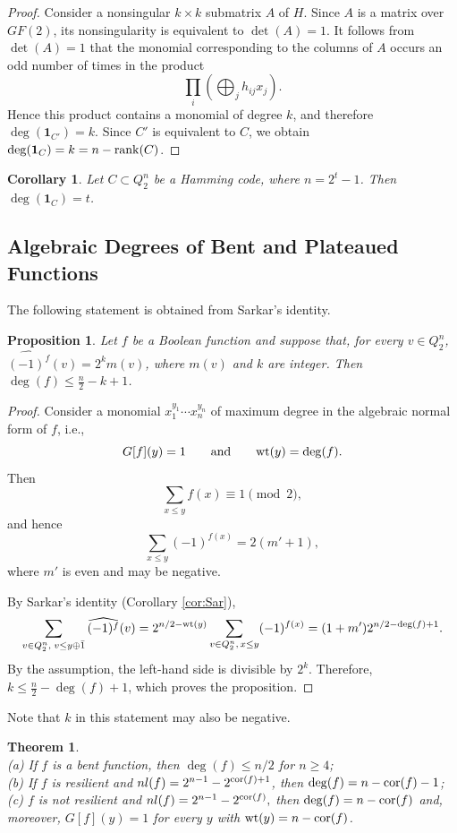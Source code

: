 \documentclass[11pt]{article}
\newtheorem{theorem}{Theorem}[section]
\newtheorem{claim}{Proposition}[section]
\newtheorem{corollary}{Corollary}[section]
\theoremstyle{definition}
\newcommand{\rank}{{\rm rank}}
\newcommand{\wt}{{\rm wt}}
\newcommand{\cor}{{\rm cor}}
\begin{document}
{{{\begin{proof}
Consider a nonsingular $k\times k$ submatrix $A$ of $H$.
Since $A$ is a matrix over $GF(2)$, its nonsingularity is equivalent to
$\det(A)=1$. It follows from $\det(A)=1$ that the monomial corresponding
to the columns of $A$ occurs an odd number of times in the product
\[
\prod_i\left(\bigoplus_j h_{ij}x_j\right).
\]
Hence this product contains a monomial of degree $k$, and therefore
$\deg({\mathbf 1}_{C'})=k$.
Since $C'$ is equivalent to $C$, we obtain
$\deg({\mathbf 1}_C)=k=n-\rank(C)$.
\end{proof}

\begin{corollary}
Let $C\subset Q_2^n$ be a Hamming code, where $n=2^t-1$. Then
$\deg({\mathbf 1}_C)=t$.
\end{corollary}




\subsection{Algebraic Degrees of Bent and Plateaued Functions}

The following statement is  obtained from Sarkar's identity.

\begin{claim}\label{bitrpro8}
Let $f$ be a Boolean function and suppose that, for every
$v\in Q_2^n$,
$\widehat{(-1)^f}(v)=2^k m(v)$,
where $m(v)$ and $k$ are  integer. Then
$\deg(f)\leq\frac{n}{2}-k+1$.
\end{claim}

\begin{proof}
Consider a monomial
$x_1^{y_1}\cdots x_n^{y_n}$
of maximum degree in the algebraic normal form of $f$, i.e.,
\[
G[f](y)=1
\qquad\text{and}\qquad
\wt(y)=\deg(f).
\]
Then
\[
\sum_{x\leq y}f(x)\equiv1\pmod 2,
\]
and hence
\[
\sum_{x\leq y}(-1)^{f(x)}=2(m'+1),
\]
where $m'$ is even and may be negative.

By Sarkar's identity (Corollary \ref{cor:Sar}),
\begin{equation}\label{eq:MT1}
\sum_{v\in Q_2^n,\;v\leq y\oplus\bar 1}
\widehat{(-1)^f}(v)
=
2^{n/2-\wt(y)}
\sum_{v\in Q_2^n,\,x\leq y}(-1)^{f(x)}
=
(1+m')2^{n/2-\deg(f)+1}.
\end{equation}
By the assumption, the left-hand side is divisible by $2^k$.
Therefore,
$k\leq\frac n2-\deg(f)+1$,
which proves the proposition.
\end{proof}
Note that $k$ in this statement may also be negative.

\begin{theorem}\label{cl:platb} \quad \\
{\rm (a)} If $f$ is a bent function, then
$\deg(f)\leq n/2$
for $n\geq4$;\\
{\rm (b)}  If $f$ is resilient and
$nl(f)=2^{n-1}-2^{\cor(f)+1}$,
then
$\deg(f)=n-\cor(f)-1$;\\
{\rm (c)}  $f$ is not resilient and
$
nl(f)=2^{n-1}-2^{\cor(f)},
$
then
$
\deg(f)=n-\cor(f)$ and,
moreover,
$G[f](y)=1$
for every $y$ with $\wt(y)=n-\cor(f)$.
\end{theorem}

}}}
\end{document}
